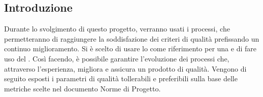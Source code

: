 \documentclass[../piano_di_qualifica.tex]{subfiles}
\begin{document}
%

\subsection{Introduzione}
Durante lo svolgimento di questo progetto, verranno usati i processi, che permetteranno di raggiungere la soddisfazione dei criteri di qualità prefissando un continuo miglioramento. Si è scelto di usare lo  come riferimento per una  e di fare uso del . Così facendo, è possibile garantire l'evoluzione dei processi che, attraverso l'esperienza, migliora e assicura un prodotto di qualità. Vengono di seguito esposti i parametri di qualità tollerabili e preferibili sulla base delle metriche scelte nel documento Norme di Progetto. %
\end{document}

